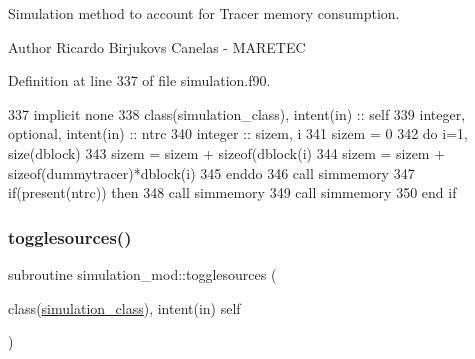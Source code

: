 Simulation method to account for Tracer memory consumption. 

\begin{DoxyAuthor}{Author}
Ricardo Birjukovs Canelas -\/ M\+A\+R\+E\+T\+EC 
\end{DoxyAuthor}


Definition at line 337 of file simulation.\+f90.


\begin{DoxyCode}
337     \textcolor{keywordtype}{implicit none}
338     \textcolor{keywordtype}{class}(simulation\_class), \textcolor{keywordtype}{intent(in)} :: self
339     \textcolor{keywordtype}{integer}, \textcolor{keywordtype}{optional}, \textcolor{keywordtype}{intent(in)} :: ntrc
340     \textcolor{keywordtype}{integer} :: sizem, i
341     sizem = 0
342     \textcolor{keywordflow}{do} i=1, \textcolor{keyword}{size}(dblock)
343         sizem = sizem + sizeof(dblock(i)%
344         sizem = sizem + sizeof(dummytracer)*dblock(i)%
345 \textcolor{keywordflow}{    enddo}
346     \textcolor{keyword}{call }simmemory%
347     \textcolor{keywordflow}{if}(\textcolor{keyword}{present}(ntrc)) \textcolor{keywordflow}{then}
348         \textcolor{keyword}{call }simmemory%
349         \textcolor{keyword}{call }simmemory%
350 \textcolor{keywordflow}{    end if}
\end{DoxyCode}
\mbox{\label{namespacesimulation__mod_a87a5141e4516b9610a6e4f0d2ff2d719}} 
\subsubsection{\texorpdfstring{togglesources()}{togglesources()}}
{\footnotesize\ttfamily subroutine simulation\+\_\+mod\+::togglesources (\begin{DoxyParamCaption}\item[{class(\mbox{\hyperlink{structsimulation__mod_1_1simulation__class}{simulation\+\_\+class}}), intent(in)}]{self }\end{DoxyParamCaption})\hspace{0.3cm}{\ttfamily [private]}}



